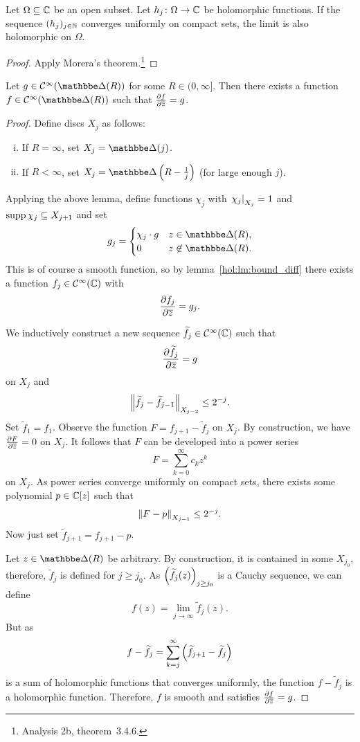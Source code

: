 \begin{lema}
Let $\Omega \subseteq \mathbb{C}$ be an open subset. Let
$h_j \colon \Omega \to \mathbb{C}$ be holomorphic functions. If the
sequence $(h_j)_{j \in \mathbb{N}}$ converges uniformly on compact sets,
the limit is also holomorphic on $\Omega$.
\end{lema}

\begin{proof}
Apply Morera's theorem.\footnote{Analysis 2b, theorem~3.4.6.}
\end{proof}

\begin{izrek}
Let $g \in \mathcal{C}^\infty(\dsk(R))$ for some
$R \in (0, \infty]$. Then there exists a function
$f \in \mathcal{C}^\infty(\dsk(R))$ such that
$\frac{\partial f}{\partial \overline{z}} = g$.
\end{izrek}

\begin{proof}
Define discs $X_j$ as follows:

\begin{enumerate}[i)]
\item If $R = \infty$, set $X_j = \dsk(j)$.
\item If $R < \infty$, set $X_j = \dsk \br{R - \frac{1}{j}}$ (for
large enough $j$).
\end{enumerate}

Applying the above lemma, define functions $\chi_j$ with
$\left. \chi_j\right|_{X_j}^{} = 1$ and $\operatorname{supp} \chi_j \subseteq X_{j+1}$ and
set
\[
g_j =
\begin{cases}
\chi_j \cdot g & z \in \dsk(R), \\
       0       & z \not \in \dsk(R).
\end{cases}
\]
This is of course a smooth function, so by
lemma~\ref{hol:lm:bound_diff} there exists a function
$f_j \in \mathcal{C}^\infty(\mathbb{C})$ with
\[
\frac{\partial f_j}{\partial \overline{z}} = g_j.
\]

We inductively construct a new sequence
$\widetilde{f}_j \in \mathcal{C}^\infty(\mathbb{C})$ such that
\[
\frac{\partial \widetilde{f}_j}{\partial \overline{z}} = g
\]
on $X_j$ and
\[
\left\lVert \widetilde{f}_j - \widetilde{f}_{j-1}\right\rVert_{X_{j-2}} \leq 2^{-j}.
\]
Set $\widetilde{f}_1 = f_1$. Observe the function
$F = f_{j+1} - \widetilde{f}_j$ on $X_j$. By construction, we have
$\frac{\partial F}{\partial \overline{z}} = 0$ on $X_j$. It follows that $F$ can be
developed into a power series
\[
F = \sum_{k=0}^\infty c_k z^k
\]
on $X_j$. As power series converge uniformly on compact sets, there
exists some polynomial $p \in \mathbb{C}[z]$ such that
\[
\left\lVert F - p\right\rVert_{X_{j-1}} \leq 2^{-j}.
\]
Now just set $\widetilde{f}_{j+1} = f_{j+1} - p$.

Let $z \in \dsk(R)$ be arbitrary. By construction, it is contained
in some $X_{j_0}$, therefore, $\widetilde{f}_j$ is defined for
$j \geq j_0$. As $\left(\widetilde{f}_j(z)\right)_{j \geq j_0}$ is a
Cauchy sequence, we can define
\[
f(z) = \lim_{j \to \infty} \widetilde{f}_j(z).
\]
But as
\[
f - \widetilde{f}_j =
\sum_{k=j}^\infty \left(\widetilde{f}_{j+1} - \widetilde{f}_j\right)
\]
is a sum of holomorphic functions that converges uniformly, the
function $f - \widetilde{f}_j$ is a holomorphic function.
Therefore, $f$ is smooth and satisfies $\frac{\partial f}{\partial \overline{z}} = g$.
\end{proof}

